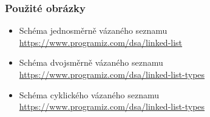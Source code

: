 \documentclass[10pt,xcolor=pdflatex,hyperref={unicode}]{beamer}
\begin{document}
\begin{frame}\frametitle{Použité obrázky}
    \begin{itemize}
        \item Schéma jednosměrně vázaného seznamu\\
        \url{https://www.programiz.com/dsa/linked-list}
        \item Schéma dvojsměrně vázaného seznamu\\
        \url{https://www.programiz.com/dsa/linked-list-types}
        \item Schéma cyklického vázaného seznamu\\
        \url{https://www.programiz.com/dsa/linked-list-types}
    \end{itemize}
\end{frame}
\end{document}
